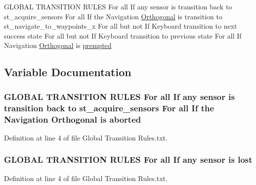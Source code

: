 \begin{DoxyCompactItemize}
\item 
G\+L\+O\+B\+AL T\+R\+A\+N\+S\+I\+T\+I\+ON R\+U\+L\+ES For all If any sensor is transition back to st\+\_\+acquire\+\_\+sensors For all If the Navigation \hyperlink{Global_01Transition_01Rules_8txt_a2e1cdec29dad5013e514270d0a78fe22}{Orthogonal} is transition to st\+\_\+navigate\+\_\+to\+\_\+waypoints\+\_\+x For all but not If Keyboard transition to next success state For all but not If Keyboard transition to previous state For all If Navigation \hyperlink{Global_01Transition_01Rules_8txt_a2e1cdec29dad5013e514270d0a78fe22}{Orthogonal} is \hyperlink{Global_01Transition_01Rules_8txt_ac6583c64beac40f27e253c605d5d5b5b}{prempted}
\end{DoxyCompactItemize}


\subsection{Variable Documentation}
\subsubsection[{\texorpdfstring{aborted}{aborted}}]{\setlength{\rightskip}{0pt plus 5cm}G\+L\+O\+B\+AL T\+R\+A\+N\+S\+I\+T\+I\+ON R\+U\+L\+ES For all If any sensor is transition back to st\+\_\+acquire\+\_\+sensors For all If the Navigation {\bf Orthogonal} is aborted}\hypertarget{Global_01Transition_01Rules_8txt_a682ac6cc3cf2eeec69ad3f310ae363ea}{}\label{Global_01Transition_01Rules_8txt_a682ac6cc3cf2eeec69ad3f310ae363ea}


Definition at line 4 of file Global Transition Rules.\+txt.

\subsubsection[{\texorpdfstring{lost}{lost}}]{\setlength{\rightskip}{0pt plus 5cm}G\+L\+O\+B\+AL T\+R\+A\+N\+S\+I\+T\+I\+ON R\+U\+L\+ES For all If any sensor is lost}\hypertarget{Global_01Transition_01Rules_8txt_a21166d43cc40d1ae31189d3fe91d8346}{}\label{Global_01Transition_01Rules_8txt_a21166d43cc40d1ae31189d3fe91d8346}


Definition at line 4 of file Global Transition Rules.\+txt.

